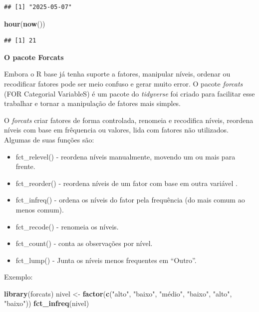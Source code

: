 \documentclass[
]{book}
\newenvironment{Shaded}{\begin{snugshade}}{\end{snugshade}}
\newcommand{\FunctionTok}[1]{\textcolor[rgb]{0.13,0.29,0.53}{\textbf{#1}}}
\newcommand{\NormalTok}[1]{#1}
\newcommand{\OtherTok}[1]{\textcolor[rgb]{0.56,0.35,0.01}{#1}}
\newcommand{\StringTok}[1]{\textcolor[rgb]{0.31,0.60,0.02}{#1}}
\providecommand{\tightlist}{%
  \setlength{\itemsep}{0pt}\setlength{\parskip}{0pt}}
\begin{document}
\begin{verbatim}
## [1] "2025-05-07"
\end{verbatim}

\begin{Shaded}
\begin{Highlighting}[]
\FunctionTok{hour}\NormalTok{(}\FunctionTok{now}\NormalTok{())}
\end{Highlighting}
\end{Shaded}

\begin{verbatim}
## [1] 21
\end{verbatim}

\textbf{O pacote Forcats}

Embora o R base já tenha suporte a fatores, manipular níveis, ordenar ou recodificar fatores pode ser meio confuso e gerar muito error. O pacote \emph{forcats} (FOR Categorial VariableS) é um pacote do \emph{tidyverse} foi criado para facilitar esse trabalhar e tornar a manipulação de fatores mais simples.

O \emph{forcats} criar fatores de forma controlada, renomeia e recodifica níveis, reordena níveis com base em frêquencia ou valores, lida com fatores não utilizados. Algumas de suas funções são:

\begin{itemize}
\tightlist
\item
  fct\_relevel() - reordena níveis manualmente, movendo um ou mais para frente.
\item
  fct\_reorder() - reordena níveis de um fator com base em outra variável .
\item
  fct\_infreq() - ordena os níveis do fator pela frequência (do mais comum ao menos comum).
\item
  fct\_recode() - renomeia os níveis.
\item
  fct\_count() - conta as observações por nível.
\item
  fct\_lump() - Junta os níveis menos frequentes em ``Outro''.
\end{itemize}

Exemplo:

\begin{Shaded}
\begin{Highlighting}[]
\FunctionTok{library}\NormalTok{(forcats)}
\NormalTok{nivel }\OtherTok{\textless{}{-}} \FunctionTok{factor}\NormalTok{(}\FunctionTok{c}\NormalTok{(}\StringTok{"alto"}\NormalTok{, }\StringTok{"baixo"}\NormalTok{, }\StringTok{"médio"}\NormalTok{, }\StringTok{"baixo"}\NormalTok{, }\StringTok{"alto"}\NormalTok{, }\StringTok{"baixo"}\NormalTok{))}
\FunctionTok{fct\_infreq}\NormalTok{(nivel)}
\end{Highlighting}
\end{Shaded}
\end{document}
